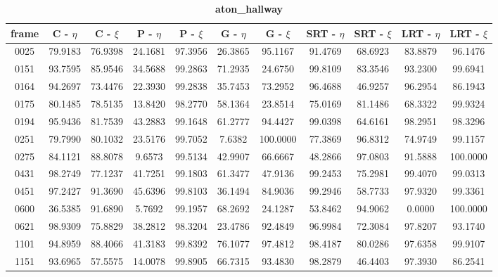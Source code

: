 \begin{appendices}
\begin{table}
\centering
\caption{\textbf{aton\_hallway}}
\begin{tabular}{ |c|c|c|c|c|c|c|c|c|c|c| }
	\hline
\textbf{frame} &  \textbf{C - $\eta$} &  \textbf{C - $\xi$} &  \textbf{P - $\eta$} &  \textbf{P - $\xi$} &  \textbf{G - $\eta$} &  \textbf{G - $\xi$} &  \textbf{SRT - $\eta$} &  \textbf{SRT - $\xi$} &  \textbf{LRT - $\eta$} &  \textbf{LRT - $\xi$} \\
\hline
\hline
0025 &  79.9183 &  76.9398 &   24.1681 &  97.3956 &   26.3865 &  95.1167 &   91.4769 &  68.6923 &   83.8879 &  96.1476   \\
\hline
0151 &  93.7595 &  85.9546 &   34.5688 &  99.2863 &   71.2935 &  24.6750 &   99.8109 &  83.3546 &   93.2300 &  99.6941    \\
\hline
0164 &  94.2697 &  73.4476 &   22.3930 &  99.2838 &   35.7453 &  73.2952 &   96.4688 &  46.9257 &   96.2954 &  86.1943    \\
\hline
0175 &  80.1485 &  78.5135 &   13.8420 &  98.2770 &   58.1364 &  23.8514 &   75.0169 &  81.1486 &   68.3322 &  99.9324    \\
\hline
0194 &  95.9436 &  81.7539 &   43.2883 &  99.1648 &   61.2777 &  94.4427 &   99.0398 &  64.6161 &   98.2951 &  98.3296    \\
\hline
0251 &  79.7990 &  80.1032 &   23.5176 &  99.7052 &   7.6382 &  100.0000 &   77.3869 &  96.8312 &   74.9749 &  99.1157    \\
\hline
0275 &  84.1121 &  88.8078 &   9.6573 &  99.5134 &   42.9907 &  66.6667 &   48.2866 &  97.0803 &   91.5888 &  100.0000    \\
\hline
0431 &  98.2749 &  77.1237 &   41.7251 &  99.1803 &   61.3477 &  47.9136 &   99.2453 &  75.2981 &   99.4070 &  99.0313    \\
\hline
0451 &  97.2427 &  91.3690 &   45.6396 &  99.8103 &   36.1494 &  84.9036 &   99.2946 &  58.7733 &   97.9320 &  99.3361    \\
\hline
0600 &  36.5385 &  91.6890 &   5.7692 &  99.1957 &   68.2692 &  24.1287 &   53.8462 &  94.9062 &   0.0000 &  100.0000    \\
\hline
0621 &  98.9309 &  75.8829 &   38.2812 &  98.3204 &   23.4786 &  92.4849 &   96.9984 &  72.3084 &   97.8207 &  93.1740    \\
\hline
1101 &  94.8959 &  88.4066 &   41.3183 &  99.8392 &   76.1077 &  97.4812 &   98.4187 &  80.0286 &   97.6358 &  99.9107    \\
\hline
1151 &  93.6965 &  57.5575 &   14.0078 &  99.8905 &   66.7315 &  93.4830 &   98.2879 &  46.4403 &   97.3930 &  86.2541   \\


\end{tabular}
\end{table}
\end{appendices}
